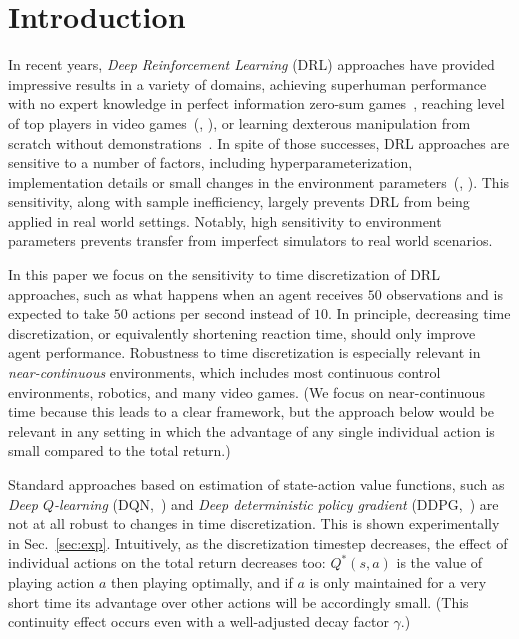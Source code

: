 
\section{Introduction}
\label{sec:intro}
In recent years, \emph{Deep Reinforcement Learning} (DRL) approaches have
provided impressive results in a variety of domains, achieving superhuman
performance with no expert knowledge in perfect information zero-sum
games~\cite{alphazero}, reaching level of top players in video
games~(\citealt{openai_five}, \citealt{dqn}), or learning dexterous manipulation
from scratch without demonstrations~\cite{hand_control}. 
In spite of those successes, DRL approaches are
sensitive to a number of factors, including hyperparameterization,
implementation details or small changes in the environment
parameters~(\citealt{drl_matter}, \citealt{drl_matter_bis}). This sensitivity,
along with sample inefficiency, largely prevents DRL from being applied in real
world settings. Notably, high sensitivity to environment parameters prevents
transfer from imperfect simulators to real world scenarios.

In this paper we focus on the sensitivity to time discretization of DRL
approaches, such as what happens when an agent receives $50$ observations
and is expected to take $50$ actions per second instead of $10$.
In principle, decreasing time discretization, or equivalently
shortening reaction time, should only improve agent performance.
Robustness to time discretization is especially relevant in
\emph{near-continuous} environments, which includes most continuous
control environments, robotics, and many video games.  
 (We focus on
near-continuous time because this leads to a clear framework, but the
approach below would be relevant in any setting in which the advantage of
any single individual action is small compared to the total return.)%

Standard approaches based on estimation of state-action
value functions, such as
\emph{Deep $Q$-learning} (DQN,~\citealt{dqn}) and \emph{Deep deterministic policy
gradient} (DDPG,~\citealt{ddpg}) are not at all robust to changes in time discretization. This is shown experimentally in Sec.~\ref{sec:exp}. 
Intuitively, as the discretization timestep
decreases, the effect of individual actions on the total return decreases
too: $Q^*(s,a)$ is the value of playing action $a$ then playing optimally,
and if $a$ is only maintained for a very short time its advantage over
other actions will be accordingly small. (This continuity effect occurs even with a
well-adjusted decay factor $\gamma$.)  

